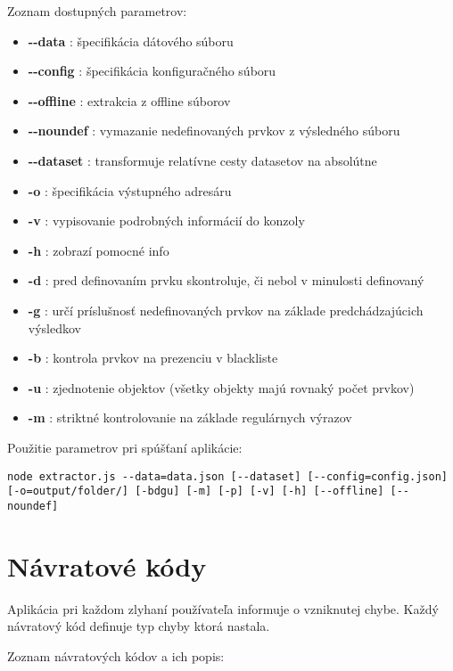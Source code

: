 Zoznam dostupných parametrov:

\begin{itemize}
    \item \textbf{-{}-data} : špecifikácia dátového súboru
    \item \textbf{-{}-config} : špecifikácia konfiguračného súboru
    \item \textbf{-{}-offline} : extrakcia z offline súborov
    \item \textbf{-{}-noundef} : vymazanie nedefinovaných prvkov z výsledného súboru
    \item \textbf{-{}-dataset} : transformuje relatívne cesty datasetov na absolútne
    \item \textbf{-o} : špecifikácia výstupného adresáru
    \item \textbf{-v} : vypisovanie podrobných informácií do konzoly
    \item \textbf{-h} : zobrazí pomocné info
    \item \textbf{-d} : pred definovaním prvku skontroluje, či nebol v minulosti definovaný
    \item \textbf{-g} : určí príslušnosť nedefinovaných prvkov na základe predchádzajúcich výsledkov
    \item \textbf{-b} : kontrola prvkov na prezenciu v blackliste
    \item \textbf{-u} : zjednotenie objektov (všetky objekty majú rovnaký počet prvkov)
    \item \textbf{-m} : striktné kontrolovanie na základe regulárnych výrazov
\end{itemize}

Použitie parametrov pri spúšťaní aplikácie:

\bigskip
\texttt{node extractor.js -{}-data=data.json  [-{}-dataset] [-{}-config=config.json]}\\
\texttt{[-o=output/folder/] [-bdgu] [-m] [-p] [-v] [-h] [-{}-offline] [-{}-noundef] }

\newpage

\section{Návratové kódy}

Aplikácia pri každom zlyhaní používateľa informuje o vzniknutej chybe. Každý návratový kód definuje typ chyby ktorá nastala.

Zoznam návratových kódov a ich popis:

\bigskip

